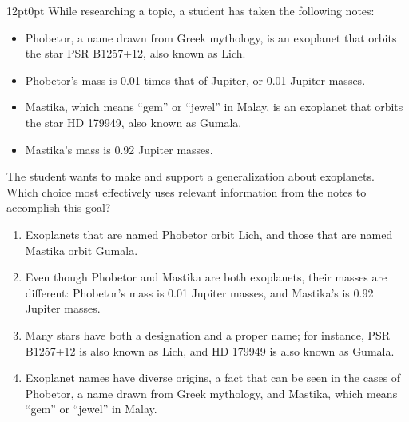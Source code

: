 \documentclass[11pt, twocolumn]{article}
\newcounter{questionnum}
\begin{document}
\vspace{6pt}\noindent
\begin{minipage}{\columnwidth}\raggedright
\noindent{}\par\vspace{8pt}
\begin{adjustwidth}{12pt}{0pt}
While researching a topic, a student has taken the following notes:

\begin{itemize}

\item Phobetor, a name drawn from Greek mythology, is an exoplanet that orbits the star PSR B1257+12, also known as Lich.

\item Phobetor's mass is 0.01 times that of Jupiter, or 0.01 Jupiter masses.

\item Mastika, which means ``gem'' or ``jewel'' in Malay, is an exoplanet that orbits the star HD 179949, also known as Gumala.

\item Mastika's mass is 0.92 Jupiter masses.

\end{itemize}
\vspace{6pt}

The student wants to make and support a generalization about exoplanets. Which choice most effectively uses relevant information from the notes to accomplish this goal?
\begin{enumerate}[label=\Alph*),leftmargin=18pt,topsep=3pt,itemsep=2pt]
  \item Exoplanets that are named Phobetor orbit Lich, and those that are named Mastika orbit Gumala.
  \item Even though Phobetor and Mastika are both exoplanets, their masses are different: Phobetor's mass is 0.01 Jupiter masses, and Mastika's is 0.92 Jupiter masses.
  \item Many stars have both a designation and a proper name; for instance, PSR B1257+12 is also known as Lich, and HD 179949 is also known as Gumala.
  \item Exoplanet names have diverse origins, a fact that can be seen in the cases of Phobetor, a name drawn from Greek mythology, and Mastika, which means ``gem'' or ``jewel'' in Malay.
\end{enumerate}
\end{adjustwidth}
\end{minipage}\par
\end{document}
